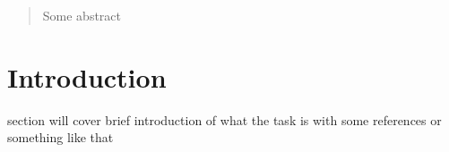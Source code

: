 \documentclass[journal]{./IEEEtran}
\begin{document}
	
	
	
	
	
	
	
	
	
	
	\maketitle
	
	\begin{abstract}
		Some abstract
	\end{abstract}
	
	
	
	
	
	
	
	
	
	
	\section{Introduction}
	 section will cover brief introduction of what the task is with some references or something like that
	
\end{document}
